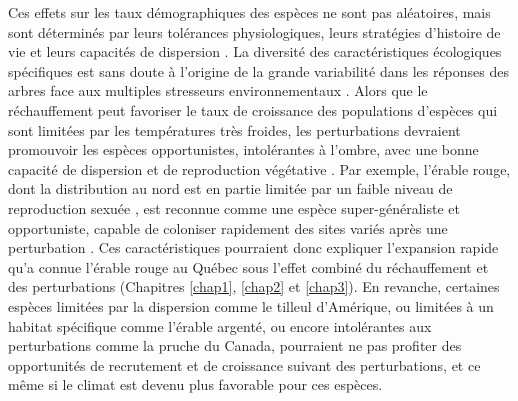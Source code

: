 Ces effets sur les taux démographiques des espèces ne sont pas
aléatoires, mais sont déterminés par leurs tolérances physiologiques,
leurs stratégies d'histoire de vie et leurs capacités de dispersion
\citep{aubin_traits_2016, estrada_species_2015}. La diversité des
caractéristiques écologiques spécifiques est sans doute à l'origine de
la grande variabilité dans les réponses des arbres face aux multiples
stresseurs environnementaux \citep{serra-diaz_disturbance_2015}. Alors
que le réchauffement peut favoriser le taux de croissance des
populations d'espèces qui sont limitées par les températures très
froides, les perturbations devraient promouvoir les espèces
opportunistes, intolérantes à l'ombre, avec une bonne capacité de
dispersion et de reproduction végétative \citep[Chapitre
\ref{chap3};][]{danneyrolles_stronger_2019, de_frenne_microclimate_2013}.
Par exemple, l'érable rouge, dont la distribution au nord est en partie
limitée par un faible niveau de reproduction sexuée
\citep{tremblay_potential_2002}, est reconnue comme une espèce
super-généraliste et opportuniste, capable de coloniser rapidement des
sites variés après une perturbation
\citep{abrams_red_1998, fei_rapid_2009}. Ces caractéristiques pourraient
donc expliquer l'expansion rapide qu'a connue l'érable rouge au Québec
sous l'effet combiné du réchauffement et des perturbations (Chapitres
\ref{chap1}, \ref{chap2} et \ref{chap3}). En revanche, certaines espèces
limitées par la dispersion comme le tilleul d'Amérique, ou limitées à un
habitat spécifique comme l'érable argenté, ou encore intolérantes aux
perturbations comme la pruche du Canada, pourraient ne pas profiter des
opportunités de recrutement et de croissance suivant des perturbations,
et ce même si le climat est devenu plus favorable pour ces espèces.

